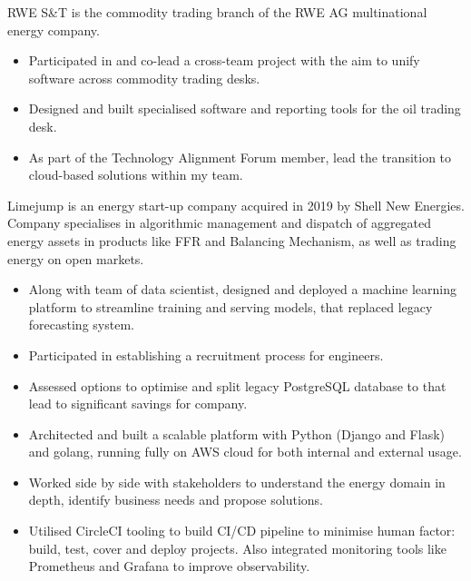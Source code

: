 \documentclass[12pt,english]{resume}
\begin{document}

		RWE S\&T is the commodity trading branch of the RWE AG multinational energy company. 

		\begin{itemize}
			\item Participated in and co-lead a cross-team project with the aim to unify software across commodity trading desks.
            \item Designed and built specialised software and reporting tools for the oil trading desk.
			\item As part of the Technology Alignment Forum member, lead the transition to cloud-based solutions within my team. 
		\end{itemize}


		Limejump is an energy start-up company acquired in 2019 by Shell New Energies. Company specialises in algorithmic management and dispatch of aggregated energy assets in products like FFR and Balancing Mechanism, as well as trading energy on open markets.

		\begin{itemize}
			\item Along with team of data scientist, designed and deployed a machine learning platform to streamline training and serving models, that replaced legacy forecasting system.
			\item Participated in establishing a recruitment process for engineers.
			\item Assessed options to optimise and split legacy PostgreSQL database to that lead to significant savings for company.
		\end{itemize}

		
		\begin{itemize}
			\item Architected and built a scalable platform with Python (Django and Flask) and golang, running fully on AWS cloud for both internal and external usage.
			\item Worked side by side with stakeholders to understand the energy domain in depth, identify business needs and propose solutions.
			\item Utilised CircleCI tooling to build CI/CD pipeline to minimise human factor: build, test, cover and deploy projects. Also integrated monitoring tools like Prometheus and Grafana to improve observability.
		\end{itemize}
				
\end{document}
